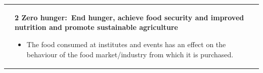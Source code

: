\documentclass[../SustainableHEP.tex]{subfiles}
\begin{document}
\begin{longtable*}{l l}
\parbox[t]{\SDGleft\textwidth}{} & \parbox[t]{\SDGright\textwidth}{\textbf{2 Zero hunger:\ End hunger, achieve food security and improved nutrition and promote sustainable agriculture}
\vspace{\recskip}
\begin{itemize}[leftmargin=20pt]
\setlength{\itemsep}{\recskip}
\item The food consumed at institutes and events has an effect on the behaviour of the food market/industry from which it is purchased.
\end{itemize}}\\


\end{longtable*}
\end{document}
